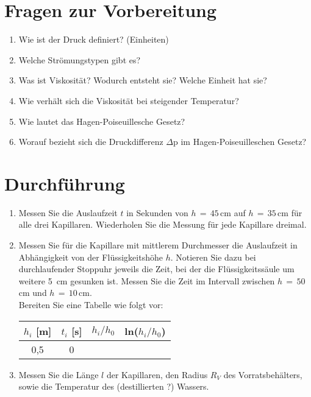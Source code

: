 \section{Fragen zur Vorbereitung}

\begin{enumerate}
 \item Wie ist der Druck definiert? (Einheiten)
 \item Welche Strömungstypen gibt es?
 \item Was ist Viskosität? Wodurch entsteht sie? Welche Einheit hat sie?
 \item Wie verhält sich die Viskosität bei steigender Temperatur?
 \item Wie lautet das Hagen-Poiseuillesche Gesetz?
 \item Worauf bezieht sich die Druckdifferenz $\Delta$p im Hagen-Poiseuilleschen Gesetz?
\end{enumerate}

\section{Durchführung} 

\begin{enumerate}
 \item Messen Sie die Auslaufzeit $t$ in Sekunden von $h\,=\,45\,$cm auf $h\,=\,35\,$cm für alle drei Kapillaren. Wiederholen Sie die Messung für jede Kapillare dreimal.
 \item Messen Sie für die Kapillare mit mittlerem Durchmesser die Auslaufzeit in Abhängigkeit von der Flüssigkeitshöhe $h$. Notieren Sie dazu bei durchlaufender Stoppuhr jeweils die Zeit, bei der die Flüssigkeitssäule um weitere 5~cm gesunken ist. Messen Sie die Zeit im Intervall zwischen $h\,=\,50\,$cm und $h\,=\,10\,$cm.\\
 Bereiten Sie eine Tabelle wie folgt vor:
 \begin{table}[h]
	\centering
		\begin{tabular}{|c|c|c|c|}
			$h_i$ [m] & $t_i$ [s] & $h_i/h_0$ & ln($h_i/h_0$)\\ \hline \hline
			0,5 & 0 & & \\
		\end{tabular}
 \end{table}
 \item Messen Sie die Länge $l$ der Kapillaren, den Radius $R_V$ des Vorratsbehälters, sowie die Temperatur des (destillierten ?) Wassers.
\end{enumerate}


